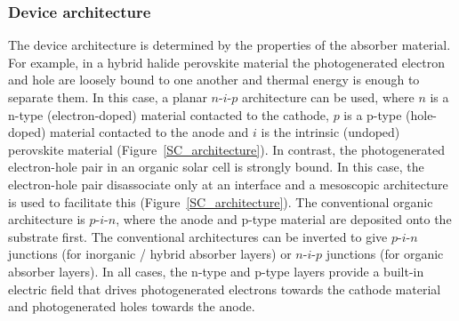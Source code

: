 \subsubsection{Device architecture}
The device architecture is determined by the properties of the absorber material. For example, in a hybrid halide perovskite material the photogenerated electron and hole are loosely bound to one another and thermal energy is enough to separate them. In this case, a planar $n$-$i$-$p$ architecture can be used, where $n$ is a n-type (electron-doped) material contacted to the cathode, $p$ is a p-type (hole-doped) material contacted to the anode and $i$ is the intrinsic (undoped) perovskite material (Figure\ \ref{SC_architecture}). In contrast, the photogenerated electron-hole pair in an organic solar cell is strongly bound. In this case, the electron-hole pair disassociate only at an interface and a mesoscopic architecture is used to facilitate this (Figure\ \ref{SC_architecture}). The conventional organic architecture is $p$-$i$-$n$, where the anode and p-type material are deposited onto the substrate first. The conventional architectures can be inverted to give $p$-$i$-$n$ junctions (for inorganic / hybrid absorber layers) or $n$-$i$-$p$ junctions (for organic absorber layers). In all cases, the n-type and p-type layers provide a built-in electric field that drives photogenerated electrons towards the cathode material and photogenerated holes towards the anode.

